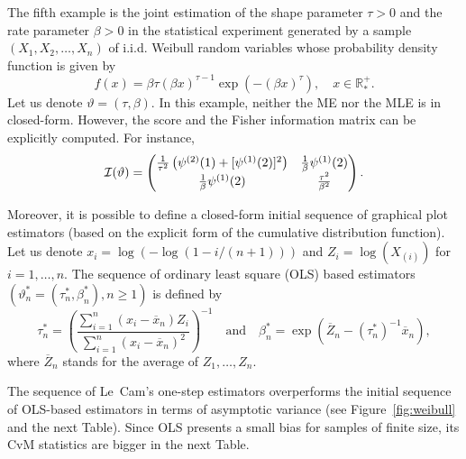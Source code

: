 The fifth example is the joint estimation of the shape parameter $\tau>0$ and the rate parameter $\beta>0$ in the statistical experiment generated by a sample $(X_1,X_2,\ldots,X_n)$ of i.i.d. Weibull random variables whose probability density function is given by
$$ f(x)= \beta \tau (\beta x)^{\tau-1} \exp \left( - (\beta x)^\tau \right), \quad x \in \mathbb{R}^+_*.$$
Let us denote $\vartheta=(\tau,\beta)$. In this example, neither the ME nor the MLE is in closed-form. However, the score and the Fisher information matrix can be explicitly computed. For instance,
$${\cal I}(\vartheta) = \begin{pmatrix}  \frac{1}{\tau^2} \left( \psi^{(2)}(1)+ [\psi^{(1)}(2)]^2 \right) & \frac{1}{\beta} \psi^{(1)}(2) \\  \frac{1}{\beta} \psi^{(1)}(2)
& \frac{\tau^2}{\beta^2}\end{pmatrix}.$$

Moreover, it is possible to define a closed-form initial sequence of graphical plot estimators (based on the explicit form of the cumulative distribution function). Let us denote $x_i=\log(-\log(1-i/(n+1)))$ and $Z_i=\log\left(X_{(i)}\right)$ for $i=1,\ldots,n$. The sequence of ordinary least square (OLS) based estimators $(\vartheta^*_n=(\tau^*_n, \beta^*_n), n \geq1)$ is defined by 
$$
\tau^*_n = \left(\frac{\sum\limits_{i=1}^n (x_i -\overline{x}_n)Z_i}{\sum\limits_{i=1}^n (x_i -\overline{x}_n)^2} \right)^{-1} \quad  \mbox{and} \quad \beta^*_n= \exp \left( \overline{Z}_n-(\tau^*_n)^{-1} \overline{x}_n \right),
$$
where $\overline{Z}_n$ stands for the average of $Z_1,\dots,Z_n$.



The sequence of Le~Cam's one-step estimators overperforms the initial sequence of OLS-based estimators in terms of asymptotic variance (see Figure~\ref{fig:weibull} and the next Table). Since OLS presents a small bias for samples of finite size, its CvM statistics are bigger in the next Table. 

